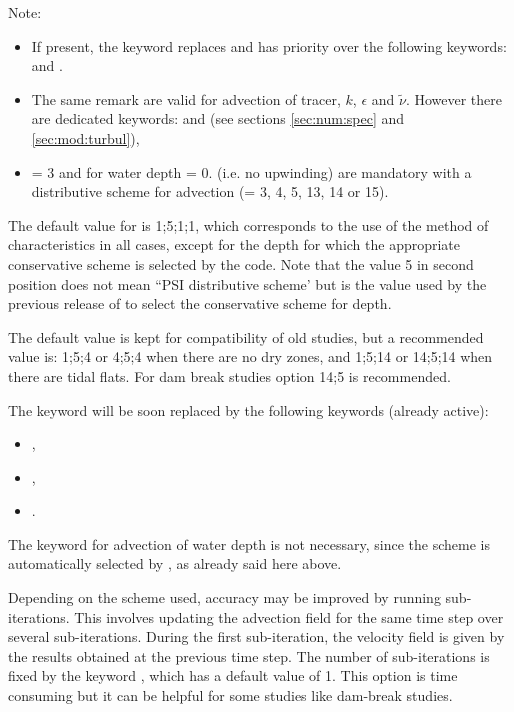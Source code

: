 \begin{WarningBlock}{Note:}
\begin{itemize}

\item If present, the keyword 
replaces and has priority over the following keywords:
 and .

\item The same remark are valid for advection of tracer, $k$, $\epsilon$ and
$\tilde{\nu}$.
However there are dedicated keywords: 
and 
(see sections \ref{sec:num:spec} and \ref{sec:mod:turbul}),

\item {} = 3 and  for water depth = 0.
(i.e. no upwinding) are mandatory with a distributive scheme
for advection (= 3, 4, 5, 13, 14 or 15).
\end{itemize}
\end{WarningBlock}

The default value for  is 1;5;1;1, which corresponds
to the use of the method of characteristics in all cases, except for the depth
for which the appropriate conservative scheme is selected by the code.
Note that the value 5 in second position does not mean
``PSI distributive scheme' but is the value used by the previous release
of  to select the conservative scheme for depth.

The default value is kept for compatibility of old studies,
but a recommended value is: 1;5;4 or 4;5;4 when there are no dry zones,
and 1;5;14 or 14;5;14 when there are tidal flats.
For dam break studies option 14;5 is recommended.

The keyword  will be soon replaced
by the following keywords (already active):
\begin{itemize}
\item {},
\item {},
\item {}.
\end{itemize}
The keyword for advection of water depth is not necessary, since the scheme is
automatically selected by , as already said here above.

Depending on the scheme used, accuracy may be improved by running sub-iterations.
This involves updating the advection field for the same time step over several
sub-iterations.
During the first sub-iteration, the velocity field is given by the results
obtained at the previous time step.
The number of sub-iterations is fixed by the keyword
,
which has a default value of 1.
This option is time consuming but it can be helpful for some studies
like dam-break studies.


